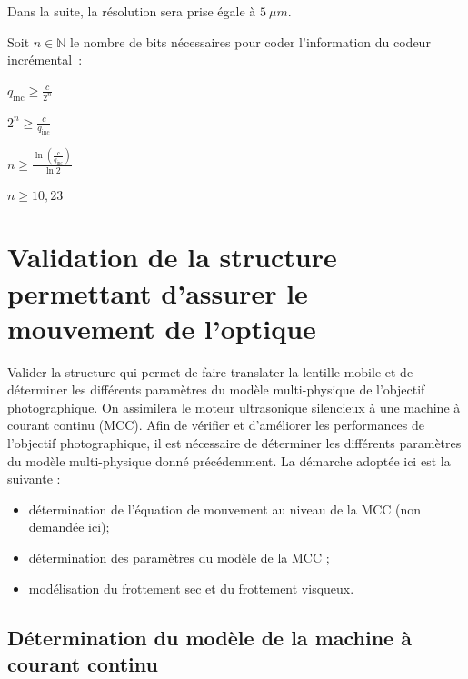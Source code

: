 Dans la suite, la résolution sera prise égale à $\SI{5}{\mu m}$.

\ifprof
\begin{corrige}
Soit \(n\mathbb{\in N}\) le nombre de bits nécessaires pour coder l'information du codeur incrémental~:


\({q_{\text{inc}} \geq \frac{c}{2^{n}}}\)

\({2^{n} \geq \frac{c}{q_{\text{inc}}}}\)

\({n \geq \frac{\ln\left( \frac{c}{q_{\text{inc}}} \right)}{\ln 2}}\)

\({n \geq 10,23}\)
\end{corrige}
\else
\fi



\section{Validation de la structure permettant d'assurer le mouvement de l'optique}\label{validation-de-la-structure-permettant-dassurer-le-mouvement-de-loptique}

\begin{obj}
Valider la structure qui permet de faire translater la lentille mobile
et de déterminer les différents paramètres du modèle multi-physique de
l'objectif photographique. On assimilera le moteur ultrasonique silencieux à une machine à courant continu (MCC).
Afin de vérifier et d'améliorer les performances de l'objectif
photographique, il est nécessaire de déterminer les différents
paramètres du modèle multi-physique donné précédemment. La démarche
adoptée ici est la suivante :

\begin{itemize}
\item
  détermination de l'équation de mouvement au niveau de la MCC (non demandée ici);
\item
  détermination des paramètres du modèle de la MCC ;
\item
  modélisation du frottement sec et du frottement visqueux.
  \end{itemize}
\end{obj}

\subsection{Détermination du modèle de la machine à courant continu}

